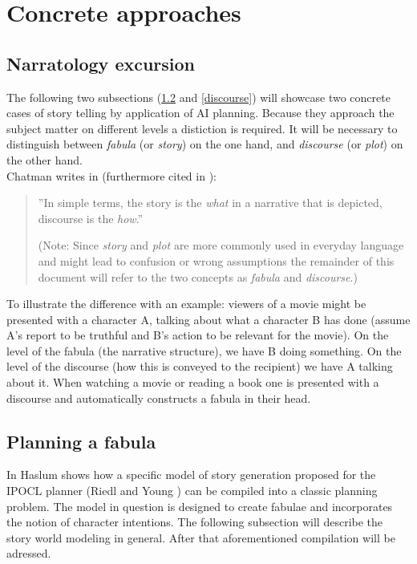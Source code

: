 \section{Concrete approaches}\label{approaches}
\subsection{Narratology excursion}
The following two subsections (\ref{fabula} and \ref{discourse}) will showcase two concrete cases of story telling by application of AI planning. Because they approach the subject matter on different levels a distiction is required. It will be necessary to distinguish between \emph{fabula} (or \emph{story}) on the one hand, and \emph{discourse} (or \emph{plot}) on the other hand.\\
Chatman writes in \cite{Chatman1980} (furthermore cited in \cite{Herman10}):
\begin{quote}
''In simple terms, the story is the \emph{what} in a narrative that is depicted, discourse is the \emph{how}.''

(Note: Since \emph{story} and \emph{plot} are more commonly used in everyday language and might lead to confusion or wrong assumptions the remainder of this document will refer to the two concepts as \emph{fabula} and \emph{discourse}.)
\end{quote}
To illustrate the difference with an example: viewers of a movie might be presented with a character A, talking about what a character B has done (assume A's report to be truthful and B's action to be relevant for the movie). On the level of the fabula (the narrative structure), we have B doing something. On the level of the discourse (how this is conveyed to the recipient) we have A talking about it. When watching a movie or reading a book one is presented with a discourse and automatically constructs a fabula in their head.
\subsection{Planning a fabula}\label{fabula}
In \cite{Haslum14} Haslum shows how a specific model of story generation proposed for the IPOCL planner (Riedl and Young \cite{Riedl10}) can be compiled into a classic planning problem. The model in question is designed to create fabulae and incorporates the notion of character intentions. The following subsection will describe the story world modeling in general. After that aforementioned compilation will be adressed.


